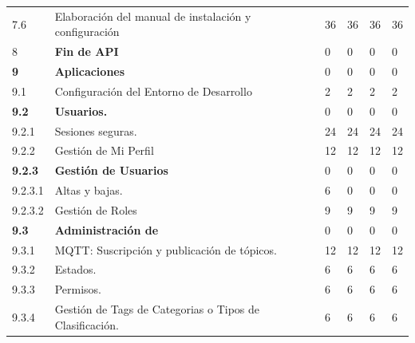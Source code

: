 \documentclass[11pt]{charter}
\begin{document}
\begin{landscape}
\begin{tabularx}{\linewidth}{@{}|p{2cm}|p{11cm}|p{2.4cm}|p{2.4cm}|p{2.4cm}|p{2.4cm}|@{}}
7.6            & Elaboración del manual de   instalación y configuración                                       & 36   & 36   & 36   & 36   \\
8              & \textbf{Fin de API}                                                                           & 0    & 0    & 0    & 0    \\
\textbf{9}     & \textbf{Aplicaciones}                                                                         & 0    & 0    & 0    & 0    \\
9.1            & Configuración del Entorno de   Desarrollo                                                     & 2    & 2    & 2    & 2    \\
\textbf{9.2}   & \textbf{Usuarios.}                                                                            & 0    & 0    & 0    & 0    \\
9.2.1          & Sesiones seguras.                                                                             & 24   & 24   & 24   & 24   \\
9.2.2          & Gestión de Mi Perfil                                                                          & 12   & 12   & 12   & 12   \\
\textbf{9.2.3} & \textbf{Gestión de Usuarios}                                                                  & 0    & 0    & 0    & 0    \\
9.2.3.1        & Altas y bajas.                                                                                & 6    & 0    & 0    & 0    \\
9.2.3.2        & Gestión de Roles                                                                              & 9    & 9    & 9    & 9    \\
\textbf{9.3}   & \textbf{Administración de}                                                                    & 0    & 0    & 0    & 0    \\
9.3.1          & MQTT: Suscripción y publicación   de tópicos.                                                 & 12   & 12   & 12   & 12   \\
9.3.2          & Estados.                                                                                      & 6    & 6    & 6    & 6    \\
9.3.3          & Permisos.                                                                                     & 6    & 6    & 6    & 6    \\
9.3.4          & Gestión de Tags de Categorias o   Tipos de Clasificación.                                     & 6    & 6    & 6    & 6    \\

\end{tabularx}
\end{landscape}
\end{document}
